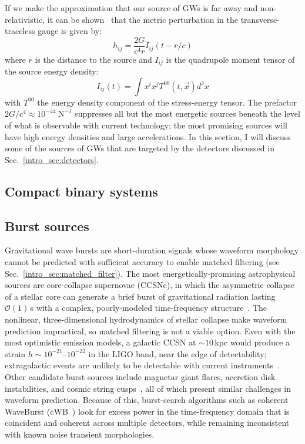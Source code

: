 If we make the approximation that our source of GWs is far away and non-relativistic, it can be shown~\cite{MTW1973} that the metric perturbation in the transverse-traceless gauge is given by:
\begin{equation}
    \label{eq:quad}
    h_{ij} = \frac{2G}{c^4 r} \ddot{I}_{ij}(t - r/c)
\end{equation}
where $r$ is the distance to the source and $I_{ij}$ is the quadrupole moment tensor of the source energy density:
\begin{equation}
    I_{ij}(t) = \int x^i x^j T^{00}(t, \vec{x}) d^3x
\end{equation}
with $T^{00}$ the energy density component of the stress-energy tensor.
The prefactor $2G/c^4 \approx 10^{-44}\ \mathrm{N}^{-1}$ suppresses all but the most energetic sources beneath the level of what is observable with current technology; the most promising sources will have high energy densities and large accelerations.
In this section, I will discuss some of the sources of GWs that are targeted by the detectors discussed in Sec.~\ref{intro_sec:detectors}.

\subsection{Compact binary systems}

\subsection{Burst sources}

Gravitational wave bursts are short-duration signals whose waveform morphology cannot be predicted with sufficient accuracy to enable matched filtering (see Sec.~\ref{intro_sec:matched_filter}).
The most energetically-promising astrophysical sources are core-collapse supernovae (CCSNe), in which the asymmetric collapse of a stellar core can generate a brief burst of gravitational radiation lasting $\mathcal{O}(1)$\,s with a complex, poorly-modeled time-frequency structure~\cite{Ott_2009}.
The nonlinear, three-dimensional hydrodynamics of stellar collapse make waveform prediction impractical, so matched filtering is not a viable option.
Even with the most optimistic emission models, a galactic CCSN at $\sim 10$\,kpc would produce a strain $h \sim 10^{-21}$--$10^{-22}$ in the LIGO band, near the edge of detectability; extragalactic events are unlikely to be detectable with current instruments~\cite{Ott_2009}.
Other candidate burst sources include magnetar giant flares, accretion disk instabilities, and cosmic string cusps~\cite{Abbott_2017_burst}, all of which present similar challenges in waveform prediction.
Because of this, burst-search algorithms such as coherent WaveBurst (cWB~\cite{Klimenko:2015ypf}) look for excess power in the time-frequency domain that is coincident and coherent across multiple detectors, while remaining inconsistent with known noise transient morphologies.

